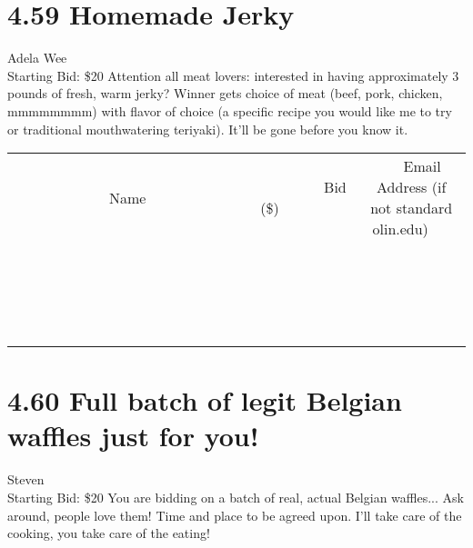 \documentclass[11pt]{article}
\begin{document}
\section*{4.59 Homemade Jerky}
Adela Wee
\\
Starting Bid: \$20
\newline
Attention all meat lovers: interested in having approximately 3 pounds of fresh, warm jerky?  Winner gets choice of meat (beef, pork, chicken, mmmmmmmm) with flavor of choice (a specific recipe you would like me to try or traditional mouthwatering teriyaki).  It'll be gone before you know it.
\\[3ex]
\begin{tabular}{c c c}
~~~~~~~~~~~~~Name~~~~~~~~~~~~~ & ~~~~~~~~~Bid (\$)~~~~~~~~~  & ~~~Email Address (if not standard olin.edu)~~~\\
 & & \\
\hline
 & & \\
\hline
 & & \\
\hline
 & & \\
\hline
 & & \\
\hline
 & & \\
\hline
 & & \\
\hline
 & & \\
\hline
 & & \\
\hline
 & & \\
\hline
 & & \\
\hline
 & & \\
\hline
 & & \\
\hline
 & & \\
\hline
 & & \\
\hline
 & & \\
\hline
 & & \\
\hline
 & & \\
\hline
 & & \\
\hline
\end{tabular}
\newpage
\section*{4.60 Full batch of legit Belgian waffles just for you!}
Steven
\\
Starting Bid: \$20
\newline
You are bidding on a batch of real, actual Belgian waffles... Ask around, people love them! Time and place to be agreed upon. I'll take care of the cooking, you take care of the eating!
\end{document}
